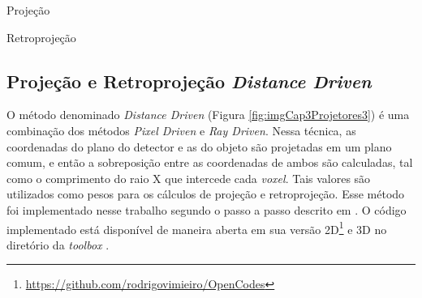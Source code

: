 \begin{algorithm}[htb]
	\SetAlgoLined
	\LinesNumberedHidden
	\caption{Projeção}
	\label{alg:algProjecao}	
\end{algorithm}


\begin{algorithm}[htb]
	\caption{Retroprojeção}
	\label{alg:algRetroprojecao}
\end{algorithm} 

\subsection{Projeção e Retroprojeção \textit{Distance Driven}} 

O método denominado \textit{Distance Driven} (Figura \ref{fig:imgCap3Projetores3}) é uma combinação dos métodos \textit{Pixel Driven} e \textit{Ray Driven}. Nessa técnica, as coordenadas do plano do detector e as do objeto são projetadas em um plano comum, e então a sobreposição entre as coordenadas de ambos são calculadas, tal como o comprimento do raio X que intercede cada \textit{voxel}. Tais valores são utilizados como pesos para os cálculos de projeção e retroprojeção. Esse método foi implementado nesse trabalho segundo o passo a passo descrito em . O código implementado está disponível de maneira aberta em sua versão \acs{2D}\footnote{\url{https://github.com/rodrigovimieiro/OpenCodes}} e \acs{3D} no diretório da \textit{toolbox} \cite{de2002distance,de2004distance}.

